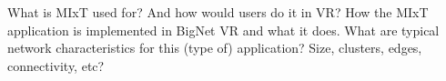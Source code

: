 What is MIxT used for? And how would users do it in VR?
How the MIxT application is implemented in BigNet VR and what it does.
What are typical network characteristics for this (type of) application? Size, clusters, edges, connectivity, etc?
